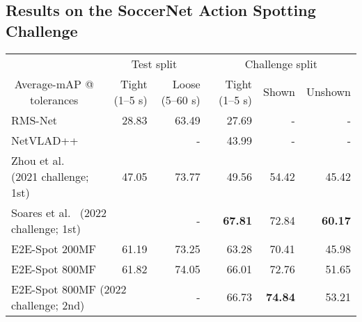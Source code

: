\documentclass[runningheads]{llncs}
\newcommand{\OURMETHOD}{{E2E-Spot}\xspace}
\newcommand{\textsuperddagger}{\textsuperscript{\textdaggerdbl}}
\newcommand{\sota}[1]{\textbf{#1}}
\begin{document}
\subsection{Results on the SoccerNet Action Spotting Challenge}
\label{sub:coarse_spotting}

\renewcommand{\tabcolsep}{0.055cm}
\begin{table*}[t]
    \caption{{\bf Average-mAP @  for tolerances in seconds.}
    SOTA in \sota{bold}.
We show the top results from the CVPR 2021 and 2022 SoccerNet Action Spotting challenges.
\textdaggerdbl~indicates challenge results --- trained on the train, validation, and test splits.
Shown and unshown refer to whether actions are visible;~\OURMETHOD is better at detecting the former, but Soares et al.~\cite{densedetectionanchorsrevisited} is superior at the latter.
    }
    \label{tab:soccernet_results}
    {
    \scriptsize
    \centering
    \begin{tabularx}{\textwidth}{lrrr|rr}
        \toprule
        & \multicolumn{2}{c}{Test split}
        & \multicolumn{3}{c}{Challenge split} \\
        \multicolumn{1}{c}{Average-mAP @ tolerances}
            & Tight (1--5 s)
            & Loose (5--60 s)
            & Tight (1--5 s)
            & Shown
            & Unshown \\
        \midrule
        RMS-Net~\cite{rmsnet}
            & 28.83
            & 63.49
            & 27.69
            & -
            & - \\
        \multicolumn{2}{l}{NetVLAD++~\cite{netvladpp}}
            - & - & 43.99 & - & - \\
        Zhou et al.~\cite{featurecombattention} (2021 challenge; 1st)
            & 47.05
            & 73.77
            & 49.56
            & 54.42
            & 45.42 \\
        \multicolumn{2}{l}{\textsuperddagger Soares et al.~\cite{densedetectionanchorsrevisited} (2022 challenge; 1st)}
            -
            & -
            & \textsuperddagger\sota{67.81}
            & \textsuperddagger72.84
            & \textsuperddagger\sota{60.17} \\
        \midrule
        \multicolumn{1}{l}{\OURMETHOD 200MF}
            & 61.19 & 73.25 & 63.28 & 70.41 & 45.98 \\
        \multicolumn{1}{l}{\OURMETHOD 800MF}
            & 61.82 & 74.05 & 66.01 & 72.76 & 51.65 \\
        \multicolumn{2}{l}{\textsuperddagger\OURMETHOD 800MF (2022 challenge; 2nd)}
            - & - & \textsuperddagger 66.73 & \textsuperddagger \sota{74.84} & \textsuperddagger 53.21 \\
        \bottomrule
    \end{tabularx}
    }
\end{table*}
 
\end{document}
